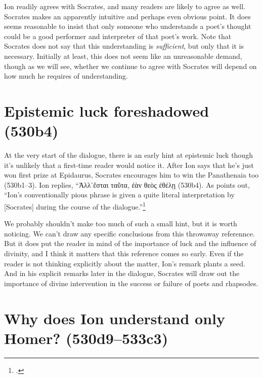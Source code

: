 \documentclass[12pt,letterpaper]{article}
\begin{document}
Ion readily agrees with Socrates, and many readers are likely to agree as well. Socrates makes an apparently intuitive and perhaps even obvious point. It does seems reasonable to insist that only someone who understands a poet's thought could be a good performer and interpreter of that poet's work. Note that Socrates does not say that this understanding is \emph{sufficient}, but only that it is necessary. Initially at least, this does not seem like an unreasonable demand, though as we will see, whether we continue to agree with Socrates will depend on how much he requires of understanding.

\section{Epistemic luck foreshadowed (530b4)}

At the very start of the dialogue, there is an early hint at epistemic luck though it's unlikely that a first-time reader would notice it. After Ion says that he's just won first prize at Epidaurus, Socrates encourages him to win the Panathenaia too (530b1--3). Ion replies, ``\textgreek{Ἀλλ᾽ἔσται ταῦτα, ἐὰν θεὸς ἐθέλῃ} (530b4). As \textcite[101]{murray1996} points out, ``Ion's conventionally pious phrase is given a quite literal interpretation by [Socrates] during the course of the dialogue.''\footcite[Monique Canto notes three other uses of this phrase in Plato: \textit{Phaedo} 69D and 80D and \textit{Hippias Major} 286C. The use in \textit{Hippias Major} is exactly like this one in \textit{Ion}, including the phrase \textgreek{ἔσται ταῦτα}. However in that case Socrates is the speaker, and he's being somewhat ironic][136]{canto2001}

We probably shouldn't make too much of such a small hint, but it is worth noticing. We can't draw any specific conclusions from this throwaway referennce. But it does put the reader in mind of the importance of luck and the influence of divinity, and I think it matters that this reference comes so early. Even if the reader is not thinking explicitly about the matter, Ion's remark plants a seed. And in his explicit remarks later in the dialogue, Socrates will draw out the importance of divine intervention in the success or failure of poets and rhapsodes.

\section{Why does Ion understand only Homer? (530d9--533c3)}
\end{document}
